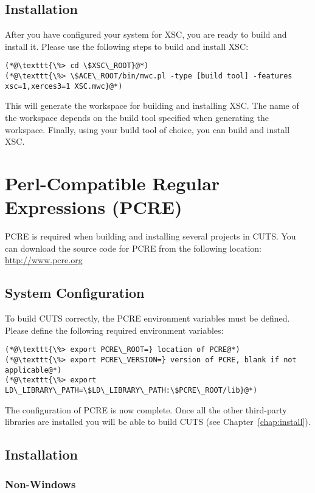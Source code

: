 \subsection{Installation}

After you have configured your system for XSC, you are ready to build and 
install it. Please use the following steps to build and install XSC:
\begin{lstlisting}
(*@\texttt{\%> cd \$XSC\_ROOT}@*)
(*@\texttt{\%> \$ACE\_ROOT/bin/mwc.pl -type [build tool] -features xsc=1,xerces3=1 XSC.mwc}@*)
\end{lstlisting}
This will generate the workspace for building and installing XSC. The name of 
the workspace depends on the build tool specified when generating the 
workspace. Finally, using your build tool of choice, you can build and 
install XSC.

\section{Perl-Compatible Regular Expressions (PCRE)}
\label{sec:thirdparty-pcre}

PCRE is required when building and installing several projects in CUTS. 
You can download the source code for PCRE from the following 
location: \url{http://www.pcre.org}

\subsection{System Configuration}

To build CUTS correctly, the PCRE environment variables must be defined. Please 
define the following required environment variables:
\begin{lstlisting}
(*@\texttt{\%> export PCRE\_ROOT=} location of PCRE@*)
(*@\texttt{\%> export PCRE\_VERSION=} version of PCRE, blank if not applicable@*)
(*@\texttt{\%> export LD\_LIBRARY\_PATH=\$LD\_LIBRARY\_PATH:\$PCRE\_ROOT/lib}@*)
\end{lstlisting}
The configuration of PCRE is now complete. Once all the other
third-party libraries are installed you will be able to build CUTS
(see Chapter~\ref{chap:install}).

\subsection{Installation}

\subsubsection{Non-Windows}
 
